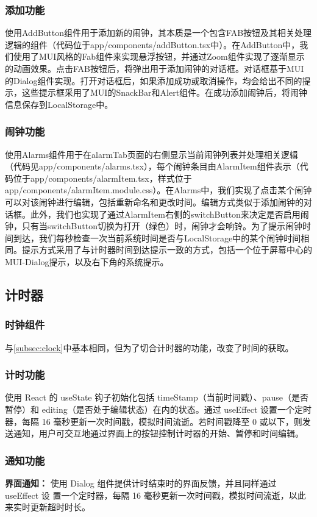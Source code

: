 \documentclass[a4paper,11pt]{article}
\begin{document}
\subsubsection{添加功能}
使用AddButton组件用于添加新的闹钟，其本质是一个包含FAB按钮及其相关处理逻辑的组件（代码位于app/components/addButton.tsx中）。在AddButton中，我们使用了MUI风格的Fab组件来实现悬浮按钮，并通过Zoom组件实现了逐渐显示的动画效果。点击FAB按钮后，将弹出用于添加闹钟的对话框。对话框基于MUI的Dialog组件实现。打开对话框后，如果添加成功或取消操作，均会给出不同的提示，这些提示框采用了MUI的SnackBar和Alert组件。在成功添加闹钟后，将闹钟信息保存到LocalStorage中。
\subsubsection{闹钟功能}
使用Alarms组件用于在alarmTab页面的右侧显示当前闹钟列表并处理相关逻辑（代码见app/components/alarms.tsx），每个闹钟条目由AlarmItem组件表示（代码位于app/components/alarmItem.tsx，样式位于app/components/alarmItem.module.css）。在Alarms中，我们实现了点击某个闹钟可以对该闹钟进行编辑，包括重新命名和更改时间。编辑方式类似于添加闹钟的对话框。此外，我们也实现了通过AlarmItem右侧的switchButton来决定是否启用闹钟，只有当switchButton切换为打开（绿色）时，闹钟才会响铃。为了提示闹钟时间到达，我们每秒检查一次当前系统时间是否与LocalStorage中的某个闹钟时间相同。提示方式采用了与计时器时间到达提示一致的方式，包括一个位于屏幕中心的MUI-Dialog提示，以及右下角的系统提示。
\subsection{计时器}
\subsubsection{时钟组件}
与\ref{subsec:clock}中基本相同，但为了切合计时器的功能，改变了时间的获取。
\subsubsection{计时功能}
使用 React 的 useState 钩子初始化包括 timeStamp（当前时间戳）、pause（是否暂停）和 editing（是否处于编辑状态）在内的状态。通过 useEffect 设置一个定时器，每隔 16 毫秒更新一次时间戳，模拟时间流逝。若时间戳降至 0 或以下，则发送通知，用户可交互地通过界面上的按钮控制计时器的开始、暂停和时间编辑。
\subsubsection{通知功能}
\textbf{界面通知：}
使用 Dialog 组件提供计时结束时的界面反馈，并且同样通过 useEffect 设
置一个定时器，每隔 16 毫秒更新一次时间戳，模拟时间流逝，以此来实时更新超时时长。
\end{document}
